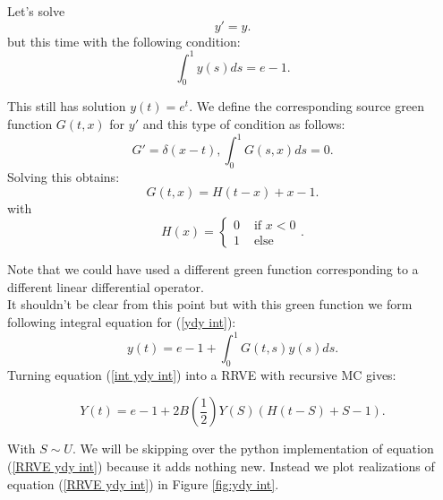 \documentclass[a4paper,12pt]{article}
\begin{document}
\begin{example}[$y'=y$]
    Let's solve
    \begin{equation} \label{ydy int}
        y'=y.
    \end{equation}
    but this time with the following condition:
    \begin{equation}
        \int_{0}^{1} y(s) ds = e-1.
    \end{equation}

    This still has solution $y(t)=e^{t}$. We define the corresponding source
    green function $G(t,x)$ for $y'$ and this type of condition as follows:
    \begin{equation}
        G'= \delta(x-t), \int_{0}^{1}G(s,x)ds = 0.
    \end{equation}
    Solving this obtains:
    \begin{equation}
        G(t,x) = H(t-x) +x-1.
    \end{equation}
    with
    \begin{equation}
        H(x) = \begin{cases}
            0 & \text{ if } x<0 \\
            1 & \text{ else }
        \end{cases}.
    \end{equation}

    Note that we could have used a different green function corresponding
    to a different linear differential operator. \\

    It shouldn't be clear from this point but with this green
    function we form following integral equation for (\ref{ydy int}):
    \begin{equation} \label{int ydy int}
        y(t)= e -1 + \int_{0}^{1}G(t,s)y(s)ds.
    \end{equation}
    Turning equation (\ref{int ydy int}) into a RRVE with recursive MC gives:

    \begin{equation}\label{RRVE ydy int}
        Y(t)= e-1 + 2B\left(\frac{1}{2} \right)Y(S)(H(t-S)+S-1) .
    \end{equation}

    With $S \sim U$. We will be skipping over the python implementation of equation (\ref{RRVE ydy int})
    because it adds nothing new.
    Instead we plot realizations of equation (\ref{RRVE ydy int}) in Figure \ref{fig:ydy int}.


\end{example}
\end{document}
